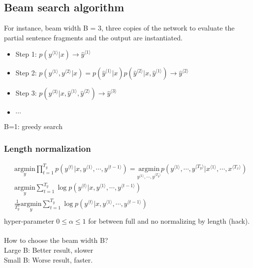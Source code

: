 \subsection{Beam search algorithm}
For instance, beam width B = 3, three copies of the network to evaluate the partial sentence fragments and the output are instantiated.
\begin{itemize}
\item
Step 1: $\displaystyle  p(y^{\langle 1 \rangle} | x) \rightarrow \hat{y}^{\langle 1 \rangle}$
\item
Step 2: $\displaystyle  p(y^{\langle 1 \rangle}, y^{\langle 2 \rangle} | x) = p(\hat{y}^{\langle 1 \rangle} | x) p(\hat{y}^{\langle 2 \rangle} | x, \hat{y}^{\langle 1 \rangle})  \rightarrow \hat{y}^{\langle 2 \rangle}$
\item
Step 3: $\displaystyle  p(y^{\langle 3 \rangle}| x, \hat{y}^{\langle 1 \rangle}  , \hat{y}^{\langle 2 \rangle} )  \rightarrow \hat{y}^{\langle 3 \rangle}$
\item
$\cdots$
\end{itemize}
B=1: greedy search

\subsubsection{Length normalization}

\begin{align*}
&\underset{y}{\mathrm{argmin}} \prod_{t=1}^{T_y} p(y^{\langle t \rangle} | x, y^{\langle 1 \rangle}, \cdots, y^{\langle t-1 \rangle}) = \underset{y^{\langle 1 \rangle}, \cdots, y^{\langle T_y\rangle}}{\mathrm{argmin}} p(y^{\langle 1 \rangle}, \cdots, y^{\langle T_y\rangle} | x^{\langle 1 \rangle}, \cdots, x^{\langle T_x \rangle})\\
& \underset{y}{\mathrm{argmin}} \sum_{t=1}^{T_y} \log p(y^{\langle t \rangle} | x, y^{\langle 1 \rangle}, \cdots, y^{\langle t-1 \rangle})\\
& \frac{1}{T_y^{\alpha}}\underset{y}{\mathrm{argmin}} \sum_{t=1}^{T_y} \log p(y^{\langle t \rangle} | x, y^{\langle 1 \rangle}, \cdots, y^{\langle t-1 \rangle})\\
\end{align*}
hyper-parameter $0 \le \alpha \le 1$ for between full and no normalizing by length (hack).\\
\\
How to choose the beam width B?\\
Large B: Better result, slower\\
Small B: Worse result, faster.\\

